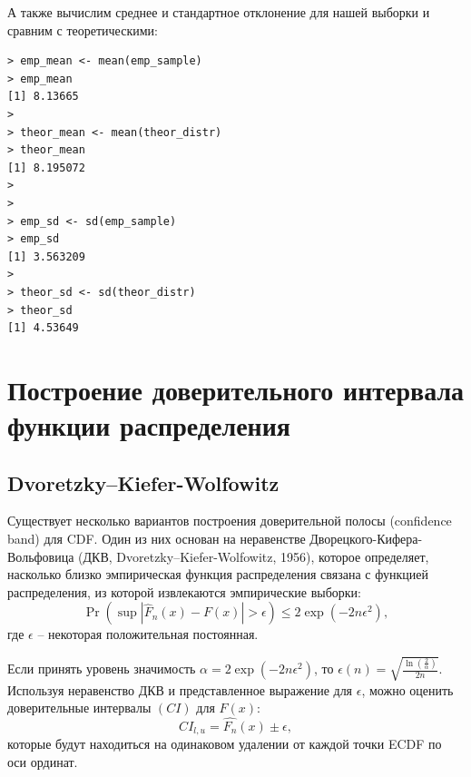 \documentclass[14pt,a4paper]{scrartcl}
\begin{document}
\begin{figure}[h]
\end{figure}

А также вычислим среднее и стандартное отклонение для нашей выборки и сравним с теоретическими:
\begin{verbatim}
> emp_mean <- mean(emp_sample)
> emp_mean
[1] 8.13665
> 
> theor_mean <- mean(theor_distr)
> theor_mean
[1] 8.195072
> 
> 
> emp_sd <- sd(emp_sample)
> emp_sd
[1] 3.563209
> 
> theor_sd <- sd(theor_distr)
> theor_sd
[1] 4.53649
\end{verbatim}


\section{Построение доверительного интервала функции распределения}
\subsection{Dvoretzky–Kiefer-Wolfowitz}
Существует несколько вариантов построения доверительной полосы (confidence band) для CDF. Один из них основан на неравенстве Дворецкого-Кифера-Вольфовица (ДКВ, Dvoretzky–Kiefer-Wolfowitz, 1956), которое определяет, насколько близко эмпирическая функция распределения связана с функцией распределения, из которой извлекаются эмпирические выборки:
\begin{equation*}
	\operatorname{Pr}\left(\sup \left|\hat{F}_{n}(x)-F(x)\right|>\epsilon\right) \leq 2 \exp \left(-2 n \epsilon^{2}\right),
\end{equation*}
где $\epsilon$ -- некоторая положительная постоянная.

Если принять уровень значимость $\alpha = 2 \exp (-2 n \epsilon^{2})$, то $\epsilon(n) = \sqrt{\frac{\ln(\frac{2}{\alpha})}{2n}}$. Используя  неравенство ДКВ и представленное выражение для $\epsilon$, можно оценить доверительные интервалы $(CI)$ для $F(x)$:
\begin{equation*}
	CI_{l,u} = \hat{F_n}(x) \pm \epsilon,
\end{equation*}
которые будут находиться на одинаковом удалении от каждой точки ECDF по оси ординат.
\end{document}
